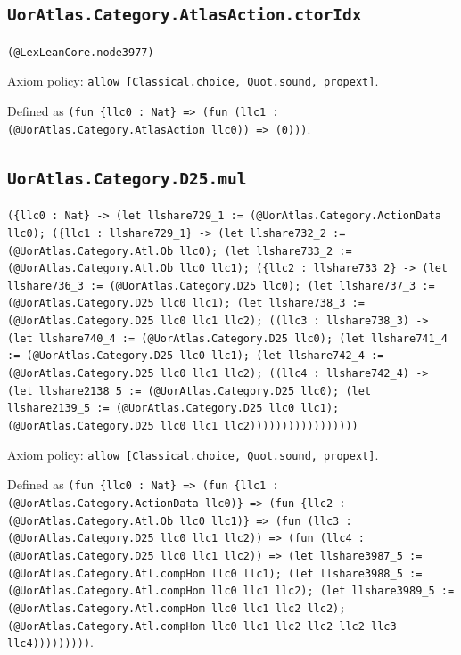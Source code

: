 \documentclass[11pt]{article}
\begin{document}
\subsection*{\texttt{UorAtlas.Category.AtlasAction.ctorIdx}}
\noindent\texttt{(@LexLeanCore.node3977)}\par
\noindent Axiom policy: \texttt{allow [Classical.choice, Quot.sound, propext]}.\par
\noindent Defined as \texttt{(fun \{llc0 : Nat\} => (fun (llc1 : (@UorAtlas.Category.AtlasAction llc0)) => (0)))}.\par
\subsection*{\texttt{UorAtlas.Category.D25.mul}}
\noindent\texttt{(\{llc0 : Nat\} -> (let llshare729\_1 := (@UorAtlas.Category.ActionData llc0); (\{llc1 : llshare729\_1\} -> (let llshare732\_2 := (@UorAtlas.Category.Atl.Ob llc0); (let llshare733\_2 := (@UorAtlas.Category.Atl.Ob llc0 llc1); (\{llc2 : llshare733\_2\} -> (let llshare736\_3 := (@UorAtlas.Category.D25 llc0); (let llshare737\_3 := (@UorAtlas.Category.D25 llc0 llc1); (let llshare738\_3 := (@UorAtlas.Category.D25 llc0 llc1 llc2); ((llc3 : llshare738\_3) -> (let llshare740\_4 := (@UorAtlas.Category.D25 llc0); (let llshare741\_4 := (@UorAtlas.Category.D25 llc0 llc1); (let llshare742\_4 := (@UorAtlas.Category.D25 llc0 llc1 llc2); ((llc4 : llshare742\_4) -> (let llshare2138\_5 := (@UorAtlas.Category.D25 llc0); (let llshare2139\_5 := (@UorAtlas.Category.D25 llc0 llc1); (@UorAtlas.Category.D25 llc0 llc1 llc2)))))))))))))))))}\par
\noindent Axiom policy: \texttt{allow [Classical.choice, Quot.sound, propext]}.\par
\noindent Defined as \texttt{(fun \{llc0 : Nat\} => (fun \{llc1 : (@UorAtlas.Category.ActionData llc0)\} => (fun \{llc2 : (@UorAtlas.Category.Atl.Ob llc0 llc1)\} => (fun (llc3 : (@UorAtlas.Category.D25 llc0 llc1 llc2)) => (fun (llc4 : (@UorAtlas.Category.D25 llc0 llc1 llc2)) => (let llshare3987\_5 := (@UorAtlas.Category.Atl.compHom llc0 llc1); (let llshare3988\_5 := (@UorAtlas.Category.Atl.compHom llc0 llc1 llc2); (let llshare3989\_5 := (@UorAtlas.Category.Atl.compHom llc0 llc1 llc2 llc2); (@UorAtlas.Category.Atl.compHom llc0 llc1 llc2 llc2 llc2 llc3 llc4)))))))))}.\par
\end{document}
